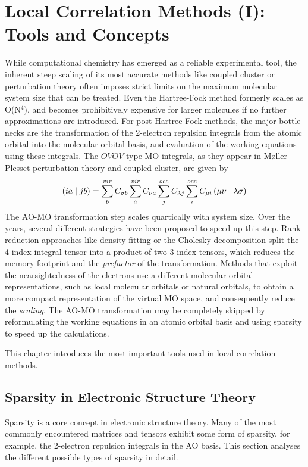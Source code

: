 \chapter{Local Correlation Methods (I): Tools and Concepts \label{cha:LOCAL0}}

While computational chemistry has emerged as a reliable experimental tool, the inherent steep scaling of its most accurate methods like coupled cluster or perturbation theory often imposes strict limits on the maximum molecular system size that can be treated. Even the Hartree-Fock method formerly scales as O(N$^4$), and becomes prohibitively expensive for larger molecules if no further approximations are introduced. For post-Hartree-Fock methods, the major bottle necks are the transformation of the 2-electron repulsion integrals from the atomic orbital into the molecular orbital basis, and evaluation of the working equations using these integrals. The $OVOV$-type MO integrals, as they appear in M{\o}ller-Plesset perturbation theory and coupled cluster, are given by
\begin{equation}
\left( ia \mid jb \right) = \sum^{vir}_b C_{\sigma b} \sum^{vir}_a C_{\nu a} \sum^{occ}_j C_{\lambda j} \sum^{occ}_i C_{\mu i} \left( \mu\nu \mid \lambda\sigma \right)
\end{equation}
The AO-MO transformation step scales quartically with system size. Over the years, several different strategies have been proposed to speed up this step. Rank-reduction approaches like density fitting or the Cholesky decomposition split the 4-index integral tensor into a product of two 3-index tensors, which reduces the memory footprint and the \emph{prefactor} of the transformation. Methods that exploit the nearsightedness of the electrons use a different molecular orbital representations, such as local molecular orbitals or natural orbitals, to obtain a more compact representation of the virtual MO space, and consequently reduce the \emph{scaling}. The AO-MO transformation may be completely skipped by reformulating the working equations in an atomic orbital basis and using sparsity to speed up the calculations.

This chapter introduces the most important tools used in local correlation methods.

\section{Sparsity in Electronic Structure Theory}

Sparsity is a core concept in electronic structure theory. Many of the most commonly encountered matrices and tensors exhibit some form of sparsity, for example, the 2-electron repulsion integrals in the AO basis. This section analyses the different possible types of sparsity in detail.

